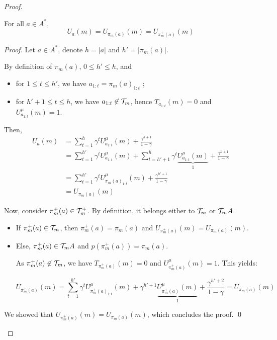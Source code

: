 \documentclass[runningheads, envcountsame, a4paper]{llncs}
\begin{document}
\begin{proof}
\begin{lemma}
\label{lemma:value-conservation}
For all $a \in A^*$,
\begin{equation*}
    U_a(m) = U_{\pi_m(a)}(m) = U_{\pi_m^+(a)}(m)
\end{equation*}
\end{lemma}
\begin{proof}
Let $a \in A^*$, denote $h=|a|$ and $h'=|\pi_m(a)|$.

By definition of $\pi_m(a)$, $0 \leq h' \leq h$, and
\begin{itemize}
    \item for $1\leq t \leq h'$, we have $a_{1:t} = {\pi_m(a)}_{1:t}$ ;
    \item for $h'+1\leq t \leq h$, we have $a_{1:t} \not \in \mathcal{T}_m$, hence $T_{a_{1:t}}(m) = 0$ and $U^{\mu}_{a_{1:t}}(m) = 1$.
\end{itemize}
Then,
\begin{align*}
    U_a(m) &= \sum_{t=1}^h \gamma^t U^{\mu}_{a_{1:t}}(m) + \frac{\gamma^{h+1}}{1-\gamma} \\
    &= \sum_{t=1}^{h'} \gamma^t U^{\mu}_{a_{1:t}}(m) + \sum_{t=h'+1}^h \gamma^t \underbrace{U^{\mu}_{a_{1:t}}(m)}_1 + \frac{\gamma^{h+1}}{1-\gamma} \\
    &= \sum_{t=1}^{h'} \gamma^t U^{\mu}_{{\pi_m(a)}_{1:t}}(m) + \frac{\gamma^{h'+1}}{1-\gamma} \\
    &= U_{\pi_m(a)}(m)
\end{align*}

Now, consider $\pi_m^+(a) \in \mathcal{T}_m^+$.
By definition, it belongs either to $\mathcal{T}_m$ or $\mathcal{T}_m A$.
\begin{itemize}
    \item If $\pi_m^+(a) \in \mathcal{T}_m$, then $\pi_m^+(a) = \pi_m(a)$ and $U_{\pi_m^+(a)}(m) = U_{\pi_m(a)}(m)$.
    \item Else, $\pi_m^+(a) \in \mathcal{T}_m A$ and $p(\pi_m^+(a)) = \pi_m(a)$.
    
    As $\pi_m^+(a) \not \in \mathcal{T}_m$, we have $T_{\pi_m^+(a)}(m) = 0$ and $U^{\mu}_{\pi_m^+(a)}(m) = 1$.
    This yields:
    
    \begin{equation*}
        U_{\pi_m^+(a)}(m) = \sum_{t=1}^{h'} \gamma^t U^{\mu}_{{\pi_m^+(a)}_{1:t}}(m) + \gamma^{h'+1} \underbrace{U^{\mu}_{{\pi_m^+(a)}}(m)}_1 + \frac{\gamma^{h'+2}}{1-\gamma} = U_{\pi_m(a)}(m)
    \end{equation*}
    
\end{itemize}
We showed that $U_{\pi_m^+(a)}(m) = U_{\pi_m(a)}(m)$, which concludes the proof.
\qed
\end{proof}


\end{proof}
\end{document}
